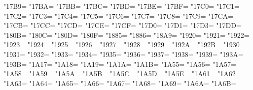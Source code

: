 \XeTeXcharclass"17B9=\KclassCM
\XeTeXcharclass"17BA=\KclassCM
\XeTeXcharclass"17BB=\KclassCM
\XeTeXcharclass"17BC=\KclassCM
\XeTeXcharclass"17BD=\KclassCM
\XeTeXcharclass"17BE=\KclassCM
\XeTeXcharclass"17BF=\KclassCM
\XeTeXcharclass"17C0=\KclassCM
\XeTeXcharclass"17C1=\KclassCM
\XeTeXcharclass"17C2=\KclassCM
\XeTeXcharclass"17C3=\KclassCM
\XeTeXcharclass"17C4=\KclassCM
\XeTeXcharclass"17C5=\KclassCM
\XeTeXcharclass"17C6=\KclassCM
\XeTeXcharclass"17C7=\KclassCM
\XeTeXcharclass"17C8=\KclassCM
\XeTeXcharclass"17C9=\KclassCM
\XeTeXcharclass"17CA=\KclassCM
\XeTeXcharclass"17CB=\KclassCM
\XeTeXcharclass"17CC=\KclassCM
\XeTeXcharclass"17CD=\KclassCM
\XeTeXcharclass"17CE=\KclassCM
\XeTeXcharclass"17CF=\KclassCM
\XeTeXcharclass"17D0=\KclassCM
\XeTeXcharclass"17D1=\KclassCM
\XeTeXcharclass"17D3=\KclassCM
\XeTeXcharclass"17DD=\KclassCM
\XeTeXcharclass"180B=\KclassCM
\XeTeXcharclass"180C=\KclassCM
\XeTeXcharclass"180D=\KclassCM
\XeTeXcharclass"180F=\KclassCM
\XeTeXcharclass"1885=\KclassCM
\XeTeXcharclass"1886=\KclassCM
\XeTeXcharclass"18A9=\KclassCM
\XeTeXcharclass"1920=\KclassCM
\XeTeXcharclass"1921=\KclassCM
\XeTeXcharclass"1922=\KclassCM
\XeTeXcharclass"1923=\KclassCM
\XeTeXcharclass"1924=\KclassCM
\XeTeXcharclass"1925=\KclassCM
\XeTeXcharclass"1926=\KclassCM
\XeTeXcharclass"1927=\KclassCM
\XeTeXcharclass"1928=\KclassCM
\XeTeXcharclass"1929=\KclassCM
\XeTeXcharclass"192A=\KclassCM
\XeTeXcharclass"192B=\KclassCM
\XeTeXcharclass"1930=\KclassCM
\XeTeXcharclass"1931=\KclassCM
\XeTeXcharclass"1932=\KclassCM
\XeTeXcharclass"1933=\KclassCM
\XeTeXcharclass"1934=\KclassCM
\XeTeXcharclass"1935=\KclassCM
\XeTeXcharclass"1936=\KclassCM
\XeTeXcharclass"1937=\KclassCM
\XeTeXcharclass"1938=\KclassCM
\XeTeXcharclass"1939=\KclassCM
\XeTeXcharclass"193A=\KclassCM
\XeTeXcharclass"193B=\KclassCM
\XeTeXcharclass"1A17=\KclassCM
\XeTeXcharclass"1A18=\KclassCM
\XeTeXcharclass"1A19=\KclassCM
\XeTeXcharclass"1A1A=\KclassCM
\XeTeXcharclass"1A1B=\KclassCM
\XeTeXcharclass"1A55=\KclassCM
\XeTeXcharclass"1A56=\KclassCM
\XeTeXcharclass"1A57=\KclassCM
\XeTeXcharclass"1A58=\KclassCM
\XeTeXcharclass"1A59=\KclassCM
\XeTeXcharclass"1A5A=\KclassCM
\XeTeXcharclass"1A5B=\KclassCM
\XeTeXcharclass"1A5C=\KclassCM
\XeTeXcharclass"1A5D=\KclassCM
\XeTeXcharclass"1A5E=\KclassCM
\XeTeXcharclass"1A61=\KclassCM
\XeTeXcharclass"1A62=\KclassCM
\XeTeXcharclass"1A63=\KclassCM
\XeTeXcharclass"1A64=\KclassCM
\XeTeXcharclass"1A65=\KclassCM
\XeTeXcharclass"1A66=\KclassCM
\XeTeXcharclass"1A67=\KclassCM
\XeTeXcharclass"1A68=\KclassCM
\XeTeXcharclass"1A69=\KclassCM
\XeTeXcharclass"1A6A=\KclassCM
\XeTeXcharclass"1A6B=\KclassCM
